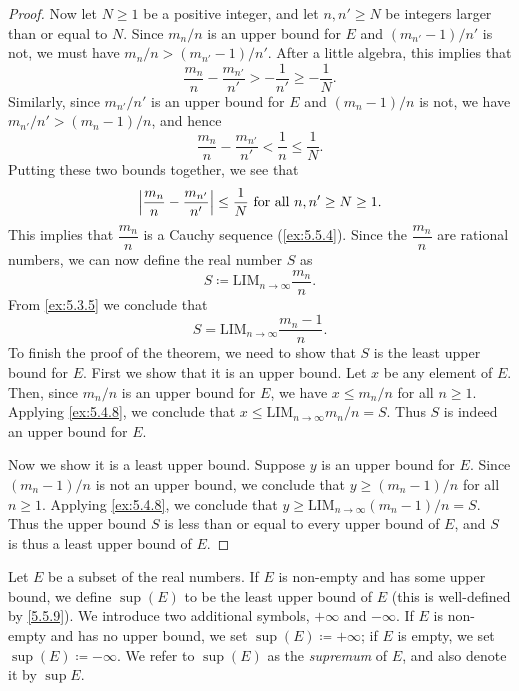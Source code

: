 \begin{proof}
  Now let \(N \geq 1\) be a positive integer, and let \(n, n' \geq N\) be integers larger than or equal to \(N\).
  Since \(m_n / n\) is an upper bound for \(E\) and \((m_{n'} - 1) / n'\) is not, we must have \(m_n / n > (m_{n'} - 1) / n'\).
  After a little algebra, this implies that
  \[
    \dfrac{m_n}{n} - \dfrac{m_{n'}}{n'} > -\dfrac{1}{n'} \geq -\dfrac{1}{N}.
  \]
  Similarly, since \(m_{n'} / n'\) is an upper bound for \(E\) and \((m_n - 1) / n\) is not, we have \(m_{n'} / n' > (m_n - 1) / n\), and hence
  \[
    \dfrac{m_n}{n} - \dfrac{m_{n'}}{n'} < \dfrac{1}{n} \leq \dfrac{1}{N}.
  \]
  Putting these two bounds together, we see that
  \[
    \left\lvert\dfrac{m_n}{n} - \dfrac{m_{n'}}{n'}\right\rvert \leq \dfrac{1}{N} \text{ for all } n, n' \geq N \geq 1.
  \]
  This implies that \(\dfrac{m_n}{n}\) is a Cauchy sequence (\cref{ex:5.5.4}).
  Since the \(\dfrac{m_n}{n}\) are rational numbers, we can now define the real number \(S\) as
  \[
    S \coloneqq \text{LIM}_{n \to \infty} \dfrac{m_n}{n}.
  \]
  From \cref{ex:5.3.5} we conclude that
  \[
    S = \text{LIM}_{n \to \infty} \dfrac{m_n - 1}{n}.
  \]
  To finish the proof of the theorem, we need to show that \(S\) is the least upper bound for \(E\).
  First we show that it is an upper bound.
  Let \(x\) be any element of \(E\).
  Then, since \(m_n / n\) is an upper bound for \(E\), we have \(x \leq m_n / n\) for all \(n \geq 1\).
  Applying \cref{ex:5.4.8}, we conclude that \(x \leq \text{LIM}_{n \to \infty} m_n / n = S\).
  Thus \(S\) is indeed an upper bound for \(E\).

  Now we show it is a least upper bound.
  Suppose \(y\) is an upper bound for \(E\).
  Since \((m_n - 1) / n\) is not an upper bound, we conclude that \(y \geq (m_n - 1) / n\) for all \(n \geq 1\).
  Applying \cref{ex:5.4.8}, we conclude that \(y \geq \text{LIM}_{n \to \infty} (m_n - 1) / n = S\).
  Thus the upper bound \(S\) is less than or equal to every upper bound of \(E\), and \(S\) is thus a least upper bound of \(E\).
\end{proof}

\begin{defn}[Supremum]\label{5.5.10}
  Let \(E\) be a subset of the real numbers.
  If \(E\) is non-empty and has some upper bound, we define \(\sup(E)\) to be the least upper bound of \(E\)
  (this is well-defined by \cref{5.5.9}).
  We introduce two additional symbols, \(+\infty\) and \(-\infty\).
  If \(E\) is non-empty and has no upper bound, we set \(\sup(E) \coloneqq +\infty\);
  if \(E\) is empty, we set \(\sup(E) \coloneqq -\infty\).
  We refer to \(\sup(E)\) as the \emph{supremum} of \(E\), and also denote it by \(\sup E\).
\end{defn}

